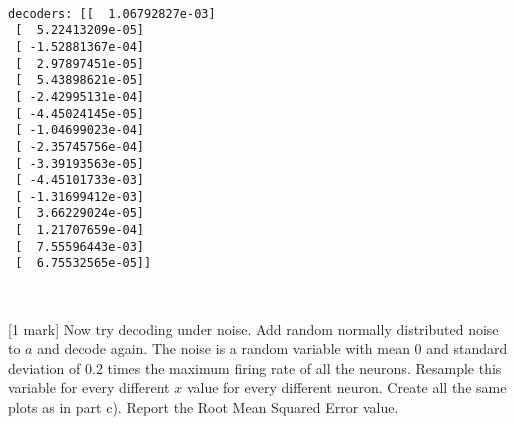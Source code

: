\documentclass{article}
\begin{document}
    \begin{center}
    \end{center}
    { \hspace*{\fill} \\}
    
    \begin{Verbatim}[commandchars=\\\{\}]
decoders: [[  1.06792827e-03]
 [  5.22413209e-05]
 [ -1.52881367e-04]
 [  2.97897451e-05]
 [  5.43898621e-05]
 [ -2.42995131e-04]
 [ -4.45024145e-05]
 [ -1.04699023e-04]
 [ -2.35745756e-04]
 [ -3.39193563e-05]
 [ -4.45101733e-03]
 [ -1.31699412e-03]
 [  3.66229024e-05]
 [  1.21707659e-04]
 [  7.55596443e-03]
 [  6.75532565e-05]]
    \end{Verbatim}

    \begin{center}
    \end{center}
    { \hspace*{\fill} \\}
    
    {[}1 mark{]} Now try decoding under noise. Add random normally
distributed noise to $a$ and decode again. The noise is a random
variable with mean 0 and standard deviation of 0.2 times the maximum
firing rate of all the neurons. Resample this variable for every
different $x$ value for every different neuron. Create all the same
plots as in part c). Report the Root Mean Squared Error value.
\end{document}

